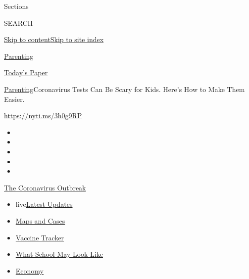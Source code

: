 Sections

SEARCH

\protect\hyperlink{site-content}{Skip to
content}\protect\hyperlink{site-index}{Skip to site index}

\href{https://www.nytimes.com/section/parenting}{Parenting}

\href{https://myaccount.nytimes.com/auth/login?response_type=cookie\&client_id=vi}{}

\href{https://www.nytimes.com/section/todayspaper}{Today's Paper}

\href{/section/parenting}{Parenting}\textbar{}Coronavirus Tests Can Be
Scary for Kids. Here's How to Make Them Easier.

\url{https://nyti.ms/3h0g9RP}

\begin{itemize}
\item
\item
\item
\item
\item
\end{itemize}

\href{https://www.nytimes.com/news-event/coronavirus?action=click\&pgtype=Article\&state=default\&region=TOP_BANNER\&context=storylines_menu}{The
Coronavirus Outbreak}

\begin{itemize}
\tightlist
\item
  live\href{https://www.nytimes.com/2020/08/01/world/coronavirus-covid-19.html?action=click\&pgtype=Article\&state=default\&region=TOP_BANNER\&context=storylines_menu}{Latest
  Updates}
\item
  \href{https://www.nytimes.com/interactive/2020/us/coronavirus-us-cases.html?action=click\&pgtype=Article\&state=default\&region=TOP_BANNER\&context=storylines_menu}{Maps
  and Cases}
\item
  \href{https://www.nytimes.com/interactive/2020/science/coronavirus-vaccine-tracker.html?action=click\&pgtype=Article\&state=default\&region=TOP_BANNER\&context=storylines_menu}{Vaccine
  Tracker}
\item
  \href{https://www.nytimes.com/interactive/2020/07/29/us/schools-reopening-coronavirus.html?action=click\&pgtype=Article\&state=default\&region=TOP_BANNER\&context=storylines_menu}{What
  School May Look Like}
\item
  \href{https://www.nytimes.com/live/2020/07/31/business/stock-market-today-coronavirus?action=click\&pgtype=Article\&state=default\&region=TOP_BANNER\&context=storylines_menu}{Economy}
\end{itemize}


